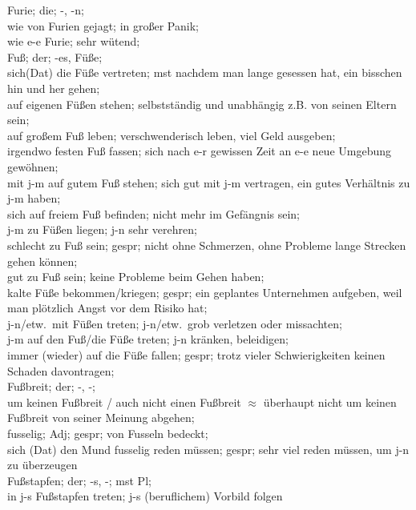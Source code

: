 \noindent
Furie; die; -, -n; \\
wie von Furien gejagt; in gro\ss{}er Panik; \\
wie e-e Furie; sehr w\"utend; \\

\noindent
Fu\ss{}; der; -es, F\"u\ss{}e; \\
sich(Dat) die F\"u\ss{}e vertreten; mst nachdem man lange gesessen hat, ein bisschen hin und her gehen;\\
auf eigenen F\"u\ss{}en stehen; selbstst\"andig und unabh\"angig z.B. von seinen Eltern sein; \\
auf gro\ss{}em Fu\ss{} leben; verschwenderisch leben, viel Geld ausgeben; \\
irgendwo festen Fu\ss{} fassen; sich nach e-r gewissen Zeit an e-e neue Umgebung gew\"ohnen; \\
mit j-m auf gutem Fu\ss{} stehen; sich gut mit j-m vertragen, ein gutes Verh\"altnis zu j-m haben; \\
sich auf freiem Fu\ss{} befinden; nicht mehr im Gef\"angnis sein; \\
j-m zu F\"u\ss{}en liegen; j-n sehr verehren;\\
schlecht zu Fu\ss{} sein; gespr; nicht ohne Schmerzen, ohne Probleme lange Strecken gehen k\"onnen;\\
gut zu Fu\ss{} sein; keine Probleme beim Gehen haben; \\
kalte F\"u\ss{}e bekommen/kriegen; gespr; ein geplantes Unternehmen aufgeben, weil man pl\"otzlich Angst vor dem Risiko hat; \\
j-n/etw.\ mit F\"u\ss{}en treten; j-n/etw.\ grob verletzen oder missachten; \\
j-m auf den Fu\ss{}/die F\"u\ss{}e treten; j-n kr\"anken, beleidigen;\\
immer (wieder) auf die F\"u\ss{}e fallen; gespr; trotz vieler Schwierigkeiten keinen Schaden davontragen; \\

\noindent
Fu\ss{}breit; der; -, -;\\
um keinen Fu\ss{}breit / auch nicht einen Fu\ss{}breit $\approx$ \"uberhaupt nicht um keinen Fu\ss{}breit von seiner Meinung abgehen; \\

\noindent
fusselig; Adj; gespr; von Fusseln bedeckt; \\
sich (Dat) den Mund fusselig reden m\"ussen; gespr; sehr viel reden m\"ussen, um j-n zu \"uberzeugen \\

\noindent
Fu\ss{}stapfen; der; -s, -; mst Pl; \\
in j-s Fu\ss{}stapfen treten; j-s (beruflichem) Vorbild folgen





